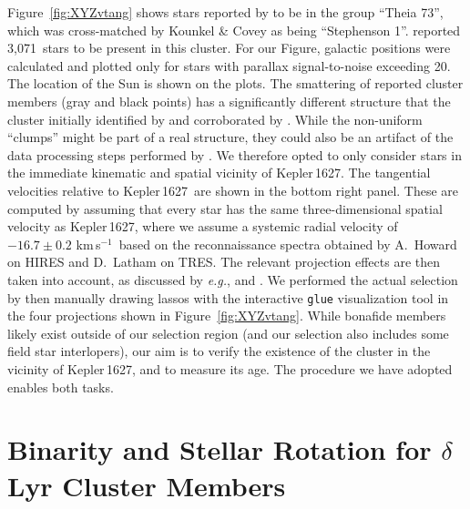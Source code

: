 \documentclass[12pt,modern,twocolumn,tighten]{aastex63}
\newcommand{\sn}{Kepler\,1627} %
\newcommand{\noriginal}{3{,}071} %
\newcommand{\kms}{\,km\,s$^{-1}$}
\begin{document}
Figure~\ref{fig:XYZvtang} shows stars reported by
\citet{kounkel_untangling_2019} to be in the group ``Theia 73'', which
was cross-matched by Kounkel \& Covey as being ``Stephenson 1''.
\citet{kounkel_untangling_2019} reported \noriginal\ stars to be
present in this cluster.  For our Figure, galactic positions were
calculated and plotted only for stars with parallax signal-to-noise
exceeding 20.  The location of the Sun is shown on the plots.  The
smattering of reported cluster members (gray and black points) has a
significantly different structure that the cluster initially
identified by \citet{stephenson_possible_1959} and corroborated by
\citet{eggen_photometric_1968}.  While the non-uniform ``clumps''
might be part of a real structure, they could also be an artifact of
the data processing steps performed by
\citet{kounkel_untangling_2019}.  We therefore opted to only consider
stars in the immediate kinematic and spatial vicinity of \sn.  The
tangential velocities relative to \sn\ are shown in the bottom right
panel.  These are computed by assuming that every star has the same
three-dimensional spatial velocity as \sn, where we assume a systemic
radial velocity of $-16.7 \pm 0.2$\,\kms\ based on the reconnaissance
spectra obtained by A.~Howard on HIRES and D.~Latham on TRES.  The
relevant projection effects are then taken into account, as discussed
by {\it e.g.}, \citet{Meingast2021} and \citet{bouma_2021_ngc2516}.
We performed the actual selection by then manually drawing lassos with
the interactive \texttt{glue} visualization tool
\citep{beaumont_2014_13866} in the four projections shown in
Figure~\ref{fig:XYZvtang}.  While bonafide members likely exist
outside of our selection region (and our selection also includes some
field star interlopers), our aim is to verify the existence of the
cluster in the vicinity of Kepler\,1627, and to measure its age.  The
procedure we have adopted enables both tasks.

\section{Binarity and Stellar Rotation for $\delta$\,Lyr Cluster Members}
\label{app:rotationbinarity}
\end{document}
